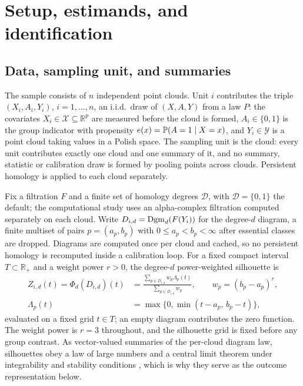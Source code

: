 
\section{Setup, estimands, and identification}
\label{sec:setup}

\subsection{Data, sampling unit, and summaries}

The sample consists of $n$ independent point clouds. Unit $i$ contributes the triple
$(X_i, A_i, Y_i)$, $i=1,\dots,n$, an i.i.d.\ draw of $(X,A,Y)$ from a law $P$: the covariates
$X_i \in \mathcal X \subseteq \mathbb R^p$ are measured before the cloud is formed,
$A_i \in \{0,1\}$ is the group indicator with propensity $e(x) = \mathbb{P}(A=1 \mid X=x)$, and
$Y_i \in \mathcal Y$ is a point cloud taking values in a Polish space. The sampling unit is the
cloud: every unit contributes exactly one cloud and one summary of it, and no summary, statistic
or calibration draw is formed by pooling points across clouds. Persistent homology is applied to
each cloud separately.

Fix a filtration $F$ and a finite set of homology degrees $\mathcal D$, with
$\mathcal D = \{0,1\}$ the default; the computational study uses an
alpha-complex filtration computed separately on each cloud.
Write $D_{i,d} = \mathrm{Dgm}_d(F(Y_i))$ for the degree-$d$ diagram,
a finite multiset of pairs $p=(a_p,b_p)$ with $0 \le a_p < b_p < \infty$ after essential classes
are dropped. Diagrams are computed once per cloud and cached, so no persistent homology is
recomputed inside a calibration loop. For a fixed compact interval $T \subset \mathbb R_+$ and a
weight power $r>0$, the degree-$d$ power-weighted silhouette is
\begin{equation}
\label{eq:silhouette}
\begin{split}
Z_{i,d}(t) = \Phi_d(D_{i,d})(t)
&= \frac{\sum_{p \in D_{i,d}} w_p \Lambda_p(t)}{\sum_{p \in D_{i,d}} w_p},
\qquad
w_p = (b_p - a_p)^r,
\\
\Lambda_p(t) &= \max\{0, \min(t - a_p,\, b_p - t)\},
\end{split}
\end{equation}
evaluated on a fixed grid $t \in T$; an empty diagram contributes the zero function. The weight
power is $r=3$ throughout, and the silhouette grid is fixed before any group contrast. As
vector-valued summaries of the per-cloud diagram law, silhouettes obey a law of large numbers and
a central limit theorem under integrability and stability conditions
\cite{bubenik_jmlr_2015,chazal_socg_2014,kim_lee_tce_2026}, which is why they serve as the
outcome representation below.

